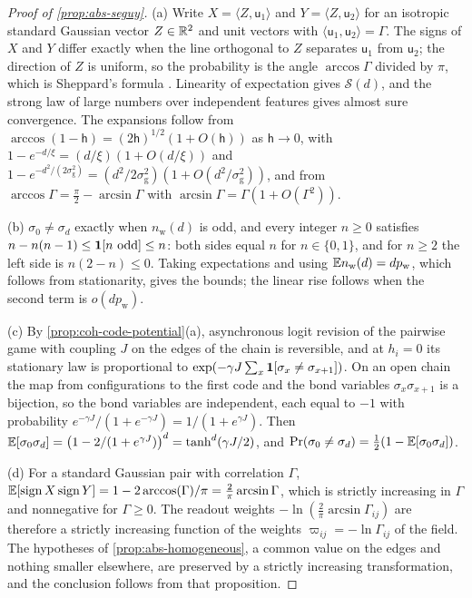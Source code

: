 \begin{proof}[Proof of \cref{prop:abs-seguy}]
(a) Write $X=\langle Z,\mathsf u_1\rangle$ and $Y=\langle Z,\mathsf u_2\rangle$ for an isotropic standard Gaussian vector $Z\in\mathbb{R}^2$ and unit vectors with $\langle\mathsf u_1,\mathsf u_2\rangle=\Gamma$. The signs of $X$ and $Y$ differ exactly when the line orthogonal to $Z$ separates $\mathsf u_1$ from $\mathsf u_2$; the direction of $Z$ is uniform, so the probability is the angle $\arccos\Gamma$ divided by $\pi$, which is Sheppard's formula \citep{sheppard1899application}. Linearity of expectation gives $\mathcal S(d)$, and the strong law of large numbers over independent features gives almost sure convergence. The expansions follow from $\arccos(1-\mathsf h)=(2\mathsf h)^{1/2}(1+O(\mathsf h))$ as $\mathsf h\to0$, with $1-e^{-d/\xi}=(d/\xi)(1+O(d/\xi))$ and $1-e^{-d^2/(2\sigma_{\mathrm g}^2)}=(d^2/2\sigma_{\mathrm g}^2)(1+O(d^2/\sigma_{\mathrm g}^2))$, and from $\arccos\Gamma=\frac\pi2-\arcsin\Gamma$ with $\arcsin\Gamma=\Gamma(1+O(\Gamma^2))$.

(b) $\sigma_0\ne\sigma_d$ exactly when $n_{\mathrm w}(d)$ is odd, and every integer $n\ge0$ satisfies $n-n(n-1)\le\mathbf{1}[n\text{ odd}]\le n$: both sides equal $n$ for $n\in\{0,1\}$, and for $n\ge2$ the left side is $n(2-n)\le0$. Taking expectations and using $\mathbb{E} n_{\mathrm w}(d)=dp_{\mathrm w}$, which follows from stationarity, gives the bounds; the linear rise follows when the second term is $o(dp_{\mathrm w})$.

(c) By \cref{prop:coh-code-potential}(a), asynchronous logit revision of the pairwise game with coupling $J$ on the edges of the chain is reversible, and at $h_i=0$ its stationary law is proportional to $\exp(-\gamma J\sum_x\mathbf{1}[\sigma_x\ne\sigma_{x+1}])$. On an open chain the map from configurations to the first code and the bond variables $\sigma_x\sigma_{x+1}$ is a bijection, so the bond variables are independent, each equal to $-1$ with probability $e^{-\gamma J}/(1+e^{-\gamma J})=1/(1+e^{\gamma J})$. Then $\mathbb{E}[\sigma_0\sigma_d]=\bigl(1-2/(1+e^{\gamma J})\bigr)^d=\tanh^d(\gamma J/2)$, and $\Pr(\sigma_0\ne\sigma_d)=\frac12(1-\mathbb{E}[\sigma_0\sigma_d])$.

(d) For a standard Gaussian pair with correlation $\Gamma$, $\mathbb{E}[\operatorname{sign}X\operatorname{sign}Y]=1-2\arccos(\Gamma)/\pi=\frac2\pi\arcsin\Gamma$, which is strictly increasing in $\Gamma$ and nonnegative for $\Gamma\ge0$. The readout weights $-\ln(\frac2\pi\arcsin\Gamma_{ij})$ are therefore a strictly increasing function of the weights $\varpi_{ij}=-\ln\Gamma_{ij}$ of the field. The hypotheses of \cref{prop:abs-homogeneous}, a common value on the edges and nothing smaller elsewhere, are preserved by a strictly increasing transformation, and the conclusion follows from that proposition.
\end{proof}

